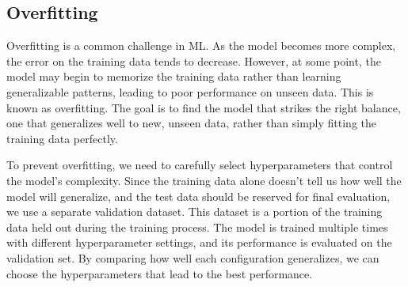 \subsection{Overfitting}
Overfitting is a common challenge in ML. 
As the model becomes more complex, the error on the training data tends to decrease. 
However, at some point, the model may begin to memorize the training data rather than learning generalizable patterns, leading to poor performance on unseen data. 
This is known as overfitting. 
The goal is to find the model that strikes the right balance, one that generalizes well to new, unseen data, rather than simply fitting the training data perfectly.

To prevent overfitting, we need to carefully select hyperparameters that control the model's complexity.
Since the training data alone doesn't tell us how well the model will generalize, and the test data should be reserved for final evaluation, we use a separate validation dataset. 
This dataset is a portion of the training data held out during the training process. 
The model is trained multiple times with different hyperparameter settings, and its performance is evaluated on the validation set. 
By comparing how well each configuration generalizes, we can choose the hyperparameters that lead to the best performance.